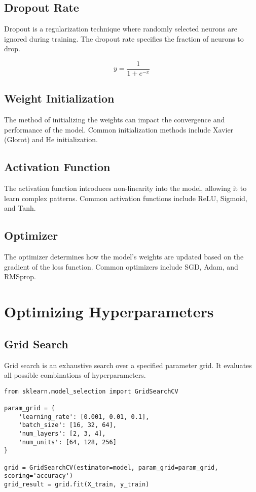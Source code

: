 \subsection{Dropout Rate}
Dropout is a regularization technique where randomly selected neurons are ignored during training. The dropout rate specifies the fraction of neurons to drop.

\begin{equation}
y = \frac{1}{1 + e^{-x}}
\end{equation}

\subsection{Weight Initialization}
The method of initializing the weights can impact the convergence and performance of the model. Common initialization methods include Xavier (Glorot) and He initialization.

\subsection{Activation Function}
The activation function introduces non-linearity into the model, allowing it to learn complex patterns. Common activation functions include ReLU, Sigmoid, and Tanh.

\subsection{Optimizer}
The optimizer determines how the model's weights are updated based on the gradient of the loss function. Common optimizers include SGD, Adam, and RMSprop.

\section{Optimizing Hyperparameters}

\subsection{Grid Search}
Grid search is an exhaustive search over a specified parameter grid. It evaluates all possible combinations of hyperparameters.

\begin{verbatim}
from sklearn.model_selection import GridSearchCV

param_grid = {
    'learning_rate': [0.001, 0.01, 0.1],
    'batch_size': [16, 32, 64],
    'num_layers': [2, 3, 4],
    'num_units': [64, 128, 256]
}

grid = GridSearchCV(estimator=model, param_grid=param_grid, scoring='accuracy')
grid_result = grid.fit(X_train, y_train)
\end{verbatim}

